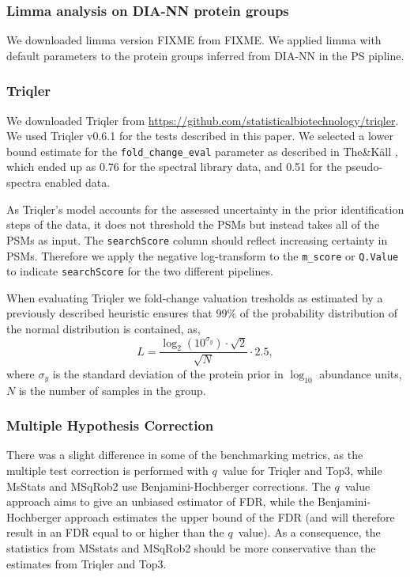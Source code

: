 \documentclass[10pt,letterpaper]{article}
\begin{document}
\subsubsection*{Limma analysis on DIA-NN protein groups}

We downloaded limma\cite{limma} version FIXME from FIXME. We applied limma with default parameters to the protein groups inferred from DIA-NN in the PS pipline.  


\subsubsection*{Triqler}

We downloaded Triqler from \url{https://github.com/statisticalbiotechnology/triqler}. We used Triqler v0.6.1 for the tests described in this paper. We selected a lower bound estimate for the \texttt{fold\_change\_eval} parameter as described in The\&K\"{a}ll \cite{the2021triqler}, which ended up as 0.76 for the spectral library data, and 0.51 for the pseudo-spectra enabled data.

As Triqler's model accounts for the assessed uncertainty in the prior identification steps of the data, it does not threshold the PSMs but instead takes all of the PSMs as input. The \texttt{searchScore} column should reflect increasing certainty in PSMs. Therefore we apply the negative log-transform to the \texttt{m\_score} or \texttt{Q.Value} to indicate \texttt{searchScore} for the two different pipelines. 

When evaluating Triqler we fold-change valuation tresholds as estimated by a previously described heuristic ensures that $99\%$ of the 
probability distribution of the normal distribution is contained, as,
\begin{equation}
 L = \frac{\log_2 \left( 10^{\sigma_y} \right) \cdot \sqrt{2}}{\sqrt{N}} \cdot 
2.5,
\end{equation}
where $\sigma_y$ is the standard deviation of the protein prior in $\log_{10}$ 
abundance units, $N$ is the number of samples in the group.


\subsubsection*{Multiple Hypothesis Correction}
There was a slight difference in some of the benchmarking metrics, as the multiple test correction is performed with $q$~value for Triqler and Top3, while MsStats and MSqRob2 use Benjamini-Hochberger \cite{benjamini1995controlling} corrections. The $q$~value approach aims to give an unbiased estimator of FDR, while the Benjamini-Hochberger approach estimates the upper bound of the FDR (and will therefore result in an FDR equal to or higher than the $q$~value). As a consequence, the statistics from MSstats and MSqRob2 should be more conservative than the estimates from Triqler and Top3\cite{korthauer2019practical}.
\end{document}
